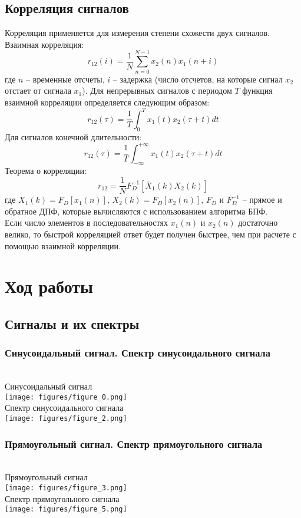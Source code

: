 \documentclass[a4paper]{article}
\begin{document}
\subsection{Корреляция сигналов}
Корреляция применяется для измерения степени схожести двух сигналов. Взаимная корреляция:
$$r_{12}(i)=\frac{1}{N}\sum_{n=0}^{N-1}x_2(n)x_1(n+i)$$
где $n$ -- временные отсчеты, $i$ -- задержка (число отсчетов, на которые сигнал $x_2$ отстает от сигнала $x_1$). Для непрерывных сигналов с периодом $T$ функция взаимной корреляции определяется следующим
образом:
$$r_{12}(\tau)=\frac{1}{T}\int_{0}^{T}x_1(t)x_2(\tau+t)dt$$
Для сигналов конечной длительности:
$$r_{12}(\tau)=\frac{1}{T}\int_{-\infty}^{+\infty}x_1(t)x_2(\tau+t)dt$$
Теорема о корреляции:
$$r_{12}=\frac{1}{N}F^{-1}_D[\overline{X}_1(k)X_2(k)]$$
где $X_1(k)=F_D[x_1(n)]$, $X_2(k)=F_D[x_2(n)]$, $F_D$ и $F_D^{-1}$ -- прямое и обратное ДПФ, которые вычисляются с использованием алгоритма БПФ.\\
Если число элементов в последовательностях $x_1(n)$ и $x_2(n)$ достаточно велико, то быстрой корреляцией
ответ будет получен быстрее, чем при расчете с помощью взаимной корреляции.
\section{Ход работы}
\subsection{Сигналы и их спектры}
\subsubsection{Синусоидальный сигнал. Спектр синусоидального сигнала}
\\
Синусоидальный сигнал\\
\texttt{[image: figures/figure\_0.png]}\\
Спектр синусоидального сигнала\\
\texttt{[image: figures/figure\_2.png]}
\newpage
\subsubsection{Прямоугольный сигнал. Спектр прямоугольного сигнала}
\\
Прямоугольный сигнал\\
\texttt{[image: figures/figure\_3.png]}\\
Спектр прямоугольного сигнала\\
\texttt{[image: figures/figure\_5.png]}
\end{document}
